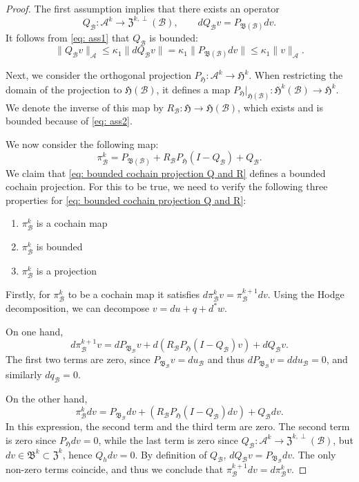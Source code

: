 \documentclass[10pt,a4paper]{amsart}
\newcommand{\Ac}{\mathcal{A}}
\newcommand{\Bc}{\mathcal{B}}
\newcommand{\Bf}{\mathfrak{B}}
\newcommand{\Hf}{\mathfrak{H}}
\newcommand{\Zf}{\mathfrak{Z}}
\begin{document}
\begin{proof}
The first assumption implies that there exists an operator
\begin{equation}
Q_\Bc: \Ac^k \to \mathfrak{Z}^{k, \perp}(\Bc), \qquad dQ_\Bc v = P_{\mathfrak{B}(\Bc)} dv.
\end{equation}
It follows from \cref{eq: ass1} that $Q_\Bc$ is bounded:
\begin{equation}
\|Q_\Bc v\|_\Ac \leq \kappa_1 \|d Q_\Bc v\|  = \kappa_1\| P_{\mathfrak{B}(\Bc)} dv \| \leq \kappa_1
\|v\|_\Ac.
\end{equation}

Next, we consider the orthogonal projection $P_\Hf: \Ac^k \to \Hf^k$. When restricting the domain of the projection to $\Hf(\Bc)$, it defines a map $P_\Hf|_{\Hf(\Bc)}: \Hf^k(\Bc) \to \Hf^k$. We denote the inverse of this map by $R_\Bc: \Hf \to \Hf(\Bc)$, which exists and is bounded because of \cref{eq: ass2}.

We now consider the following map:
\begin{equation}\label{eq: bounded cochain projection Q and R}
\pi_\Bc^k = P_{\mathfrak{B}(\Bc)} + R_\Bc P_{\mathfrak{H}}(I - Q_\Bc) + Q_\Bc. 
\end{equation}
We claim that \cref{eq: bounded cochain projection Q and R} defines a bounded cochain projection. For this to be true, we need to verify the following three properties for \cref{eq: bounded cochain projection Q and R}: 
\begin{enumerate}
    \item $\pi_\Bc^k$ is a cochain map
    \item $\pi_\Bc^k$ is bounded
    \item $\pi_\Bc^k$ is a projection
\end{enumerate}
Firstly, for $\pi^k_\Bc$ to be a cochain map it satisfies $d\pi^k_\Bc v = \pi^{k+1}_\Bc dv$. Using the Hodge decomposition, we can decompose $v = du + q + d^*w$.

On one hand, 
\begin{equation}
d\pi_\Bc^{k+1} v = dP_{\Bf_\Bc} v + d(R_\Bc P_\Hf (I - Q_\Bc ) v) + dQ_\Bc v.
\end{equation}
The first two terms are zero, since $P_{\Bf_\Bc} v = du_\Bc$ and thus $dP_{\Bf_\Bc} v= ddu_\Bc = 0$, and similarly $dq_\Bc = 0$.

On the other hand, 
\begin{equation}
\pi_\Bc^k dv = P_{\Bf_\Bc} dv + (R_\Bc P_\Hf (I - Q_\Bc) dv) + Q_\Bc dv.
\end{equation}
In this expression, the second term and the third term are zero. The second term is zero since $P_\Hf dv = 0$, while the last term is zero since $Q_\Bc: \Ac^k \to \Zf^{k,\perp}(\Bc)$, but $dv \in \Bf^k \subset \Zf^k$, hence $Q_h dv = 0$. By definition of $Q_\Bc$, $dQ_\Bc v = P_{\Bf_\Bc} dv$. The only non-zero terms coincide, and thus we conclude that $\pi_\Bc^{k+1} dv = d\pi^k_\Bc v$.



\end{proof}
\end{document}
